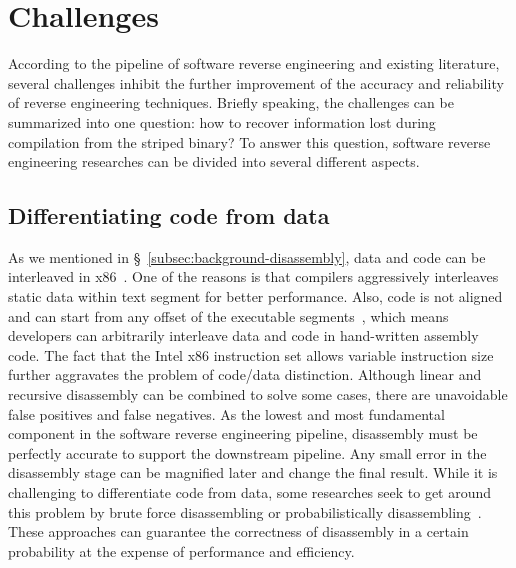 \chapter{Challenges}\label{sec-challenges}

According to the pipeline of software reverse engineering and existing
literature, several challenges inhibit the further improvement of the accuracy
and reliability of reverse engineering techniques. Briefly speaking, the
challenges can be summarized into one question: how to recover information lost
during compilation from the striped binary? To answer this question, software
reverse engineering researches can be divided into several different aspects.

\section{Differentiating code from data} \label{sec:challenges-data-or-code}
As we mentioned in \S~\ref{subsec:background-disassembly}, data and code can be
interleaved in x86~\cite{caballero2016type}. One of the reasons is that
compilers aggressively interleaves static data within text segment for better
performance. Also, code is not aligned and can start from any offset of the
executable segments~\cite{bauman2018superset}, which means developers can
arbitrarily interleave data and code in hand-written assembly code. The fact
that the Intel x86 instruction set allows variable instruction size further
aggravates the problem of code/data distinction. Although linear and recursive
disassembly can be combined to solve some cases, there are unavoidable false
positives and false negatives. As the lowest and most fundamental component in
the software reverse engineering pipeline, disassembly must be perfectly
accurate to support the downstream pipeline. Any small error in the disassembly
stage can be magnified later and change the final result.
While it is challenging to differentiate code from data, some researches seek
to get around this problem by brute force disassembling or probabilistically
disassembling~\cite{bauman2018superset,miller2019probabilistic}. These
approaches can guarantee the correctness of disassembly in a certain
probability at the expense of performance and efficiency.

